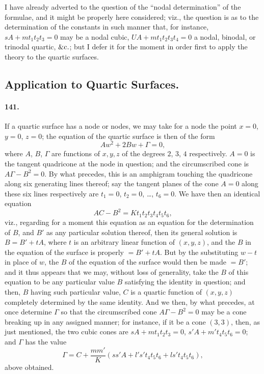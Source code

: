 \documentclass[11pt,a4paper]{article}
\begin{document}
I have already adverted to the question of the ``nodal determination'' of
the formulae, and it might be properly here considered; viz., the question
is as to the determination of the constants in such manner that, for
instance, $sA + m t_1 t_2 t_3 = 0$ may be a nodal cubic,
$UA + m t_1 t_2 t_3 t_4 = 0$ a nodal, binodal, or trinodal quartic,
$\&{\rm c}.$; but I defer it for the moment in order first to apply the
theory to the quartic surfaces.

\subsection*{Application to Quartic Surfaces.}

\paragraph{141.}
If a quartic surface has a node or nodes, we may take for a node the
point $x = 0$, $y = 0$, $z = 0$; the equation of the quartic surface is
then of the form
\[
A w^2 + 2 B w + \Gamma = 0,
\]
where $A$, $B$, $\Gamma$ are functions of $x, y, z$ of the degrees $2$,
$3$, $4$ respectively. $A = 0$ is the tangent quadricone at the node in
question; and the circumscribed cone is $A\Gamma - B^2 = 0$. By what
precedes, this is an amphigram touching the quadricone along six
generating lines thereof; say the tangent planes of the cone $A = 0$
along these six lines respectively are $t_1 = 0$, $t_2 = 0$, \dots,
$t_6 = 0$. We have then an identical equation
\[
AC - B^2 = K t_1 t_2 t_3 t_4 t_5 t_6,
\]
viz., regarding for a moment this equation as an equation for the
determination of $B$, and $B'$ as any particular solution thereof, then
its general solution is $B = B' + tA$, where $t$ is an arbitrary linear
function of $(x, y, z)$, and the $B$ in the equation of the surface is
properly $= B' + tA$. But by the substituting $w - t$ in place of $w$,
the $B$ of the equation of the surface would then be made $= B'$; and it
thus appears that we may, without loss of generality, take the $B$ of
this equation to be any particular value $B$ satisfying the identity in
question; and then, $B$ having such particular value, $C$ is a quartic
function of $(x, y, z)$ completely determined by the same identity. And
we then, by what precedes, at once determine $\Gamma$ so that the
circumscribed cone $A\Gamma - B^2 = 0$ may be a cone breaking up in any
assigned manner; for instance, if it be a cone $(3, 3)$, then, as just
mentioned, the two cubic cones are $sA + m t_1 t_2 t_3 = 0$,
$s'A + m' t_4 t_5 t_6 = 0$; and $\Gamma$ has the value
\[
\Gamma = C + \frac{m m'}{K}(s s'A + l' s' t_4 t_5 t_6 + l s' t_4 t_5 t_6),
\]
above obtained.
\end{document}
